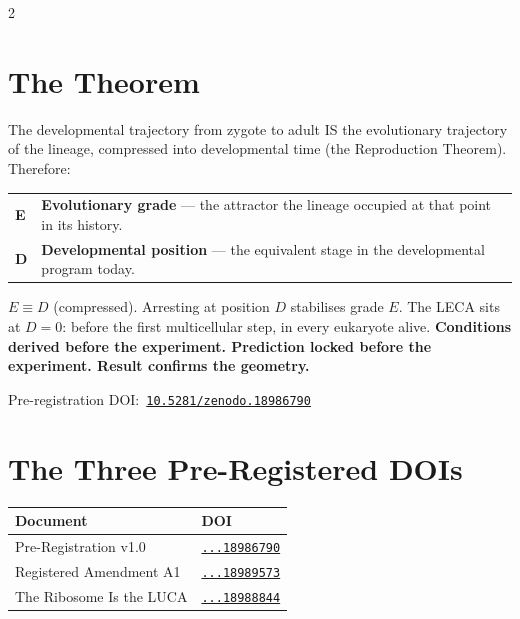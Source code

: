 \documentclass[9.5pt, a4paper]{article}
\begin{document}
\begin{multicols}{2}


\section{The Theorem}

The developmental trajectory from zygote to
adult IS the evolutionary trajectory of the
lineage, compressed into developmental time
(the Reproduction Theorem). Therefore:

\smallskip
{\small
\begin{tabular}{p{0.55cm}p{5.5cm}}
\textbf{E} &
\textbf{Evolutionary grade} --- the attractor
the lineage occupied at that point in its
history. \\[0.2em]
\textbf{D} &
\textbf{Developmental position} --- the
equivalent stage in the developmental
program today. \\
\end{tabular}
}

\smallskip
{\small
$E \equiv D$ (compressed). Arresting at
position $D$ stabilises grade $E$.
The LECA sits at $D{=}0$: before the first
multicellular step, in every eukaryote alive.
\textbf{Conditions derived before the experiment.
Prediction locked before the experiment.
Result confirms the geometry.}
}

{\footnotesize
Pre-registration DOI:\
\href{https://doi.org/10.5281/zenodo.18986790}
{\texttt{10.5281/zenodo.18986790}}
}

\section{The Three Pre-Registered DOIs}

{\footnotesize
\begin{tabular}{p{3.6cm}p{2.4cm}}
\toprule
\textbf{Document} & \textbf{DOI} \\
\midrule
Pre-Registration v1.0 &
\href{https://doi.org/10.5281/zenodo.18986790}
{\texttt{...18986790}} \\[0.1em]
Registered Amendment A1 &
\href{https://doi.org/10.5281/zenodo.18989573}
{\texttt{...18989573}} \\[0.1em]
The Ribosome Is the LUCA &
\href{https://doi.org/10.5281/zenodo.18988844}
{\texttt{...18988844}} \\
\bottomrule
\end{tabular}

}
\end{multicols}
\end{document}
